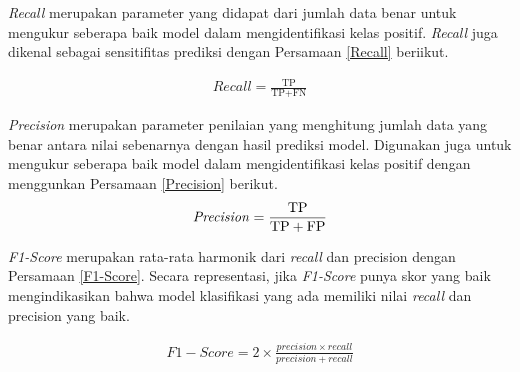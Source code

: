     \textit{Recall} merupakan parameter yang didapat dari jumlah data benar untuk mengukur seberapa baik model dalam mengidentifikasi kelas positif. \textit{Recall} juga dikenal sebagai sensitifitas prediksi dengan Persamaan \ref{Recall} beriikut.

    
    \begin{equation} 
        \begin{aligned}
            \textit{Recall} = \frac{\text{TP}}{\text{TP} + \text{FN}} 
        \end{aligned}\label{Recall}
    \end{equation}

    \textit{Precision} merupakan parameter penilaian yang menghitung jumlah data yang benar antara nilai sebenarnya dengan hasil prediksi model. Digunakan juga untuk mengukur seberapa baik model dalam mengidentifikasi kelas positif dengan menggunkan Persamaan \ref{Precision} berikut.
     \begin{equation}
        \begin{aligned}
            \text{\textit{Precision}} = \frac{\text{TP}}{\text{TP} + \text{FP}}
        \end{aligned}\label{Precision}
    \end{equation}

    \textit{F1-Score} merupakan rata-rata harmonik dari \textit{recall} dan precision dengan Persamaan \ref{F1-Score}. Secara representasi, jika \textit{F1-Score} punya skor yang baik mengindikasikan bahwa model klasifikasi yang ada memiliki nilai \textit{recall} dan precision yang baik.

     \begin{equation}
        \begin{aligned}
         F1-Score =   2 \times \frac{precision \times recall}{precision + recall}
        \end{aligned}\label{F1-Score}
    \end{equation}

    


    

